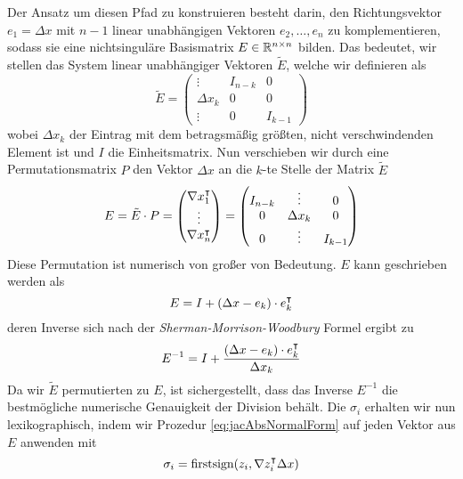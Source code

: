 Der Ansatz um diesen Pfad zu konstruieren besteht darin, den Richtungsvektor $e_1 = \Delta x$ mit $n-1$ linear unabhängigen Vektoren $e_2,\ldots, e_n$ zu komplementieren, sodass sie eine nichtsinguläre Basismatrix $E\in \mathbb{R}^{n\times n}$ bilden.
Das bedeutet, wir stellen das System linear unabhängiger Vektoren $\tilde E$, welche wir definieren als
\[
\tilde E = 
 \begin{pmatrix}
  \vdots   & I_{n-k} & 0 \\
  \Delta x_k & 0&0\\
  \vdots   & 0&I_{k-1}
 \end{pmatrix}
\]
wobei $\Delta x_k$ der Eintrag mit dem betragsmäßig größten, nicht verschwindenden Element ist und $I$ die Einheitsmatrix. Nun verschieben wir durch eine Permutationsmatrix $P$ den Vektor $\Delta x$ an die $k$-te Stelle der Matrix $\tilde E$
\[
E = \tilde E \cdot P=
\begin{pmatrix}
  \nabla x_1^\intercal\\
  \vdots\\
  \nabla x_n^\intercal\\
 \end{pmatrix}
 =
  \begin{pmatrix}
   I_{n-k} & \vdots &0\\
  0 & \Delta x_k & 0\\
    0 & \vdots&I_{k-1}
 \end{pmatrix}
\]
Diese Permutation ist numerisch von großer von Bedeutung. $E$ kann geschrieben werden als
\[
  E = I + (\Delta x-e_k)\cdot e_k^\intercal 
\] 
deren Inverse sich nach der \textit{Sherman-Morrison-Woodbury} Formel ergibt zu
\[
 E^{-1} = I + \frac{(\Delta x-e_k)\cdot e_k^\intercal}{\Delta x_k}
\]
Da wir $\tilde E$ permutierten zu $E$, ist sichergestellt, dass das Inverse $E^{-1}$ die bestmögliche numerische Genauigkeit der Division behält.
Die $\sigma_i$ erhalten wir nun lexikographisch, indem wir Prozedur \eqref{eq:jacAbsNormalForm} auf jeden Vektor aus $E$ anwenden mit 
\[
  \sigma_i = \text{firstsign}(z_i,\nabla z_i^\intercal\Delta x)
\]

